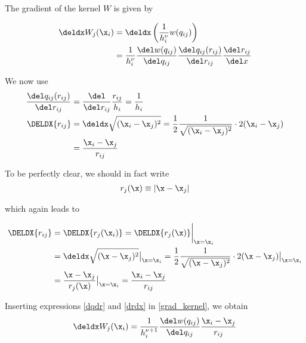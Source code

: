 The gradient of the kernel $W$ is given by

\begin{align}
	\deldx W_j (\x_i) 	&= \deldx \left( \frac{1}{h_i^\nu} w ( q_{ij} )	\right)	\nonumber \\
						&= \frac{1}{h_i^\nu} \frac{\del w(q_{ij})}{\del q_{ij}} \frac{\del q_{ij}(r_{ij})}{\del r_{ij}} \frac{\del r_{ij}}{\del x} 	\label{grad_kernel}
\end{align}




We now use
\begin{align}
	\frac{\del q_{ij}(r_{ij})}{\del r_{ij}} 	&= \frac{\del}{\del r_{ij}} \frac{r_{ij}}{h_i} = \frac{1}{h_i}		\label{dqdr} \\
	\DELDX{r_{ij}}		&= \deldx \sqrt{(\x_i - \x_j)^2}
							= \frac{1}{2} \frac{1}{\sqrt{(\x_i - \x_j)^2}} \cdot 2 (\x_i - \x_j) \nonumber \\
						&= \frac{\x_i - \x_j}{r_{ij}} 	\label{drdx}
\end{align}











To be perfectly clear, we should in fact write
\begin{align*}
	r_j(\x) & \equiv | \x - \x_j | \\
\end{align*}

which again leads to

\begin{align*}
	\DELDX{r_{ij}}		&= \DELDX{r_j(\x_i)} = \DELDX{r_j(\x)} \bigg{|}_{\x = \x_i} \\
						&= \deldx \sqrt{(\x - \x_j)^2} \big{|}_{\x = \x_i}
							= \frac{1}{2} \frac{1}{\sqrt{(\x - \x_j)^2}} \cdot 2 (\x - \x_j)  \big{|}_{\x = \x_i} \\
						&= \frac{\x - \x_j}{r_{j}(\x)} \big{|}_{\x = \x_i}
							= \frac{\x_i - \x_j}{r_{ij}}
\end{align*}



















Inserting expressions \ref{dqdr} and \ref{drdx} in \ref{grad_kernel}, we obtain
\begin{equation}
	\deldx W_j (\x_i)  = \frac{1}{h_i^{\nu + 1}} \frac{\del w(q_{ij})}{\del q_{ij}}  \frac{\x_i - \x_j}{r_{ij}} 	\label{grad_kernel_final}
\end{equation}










